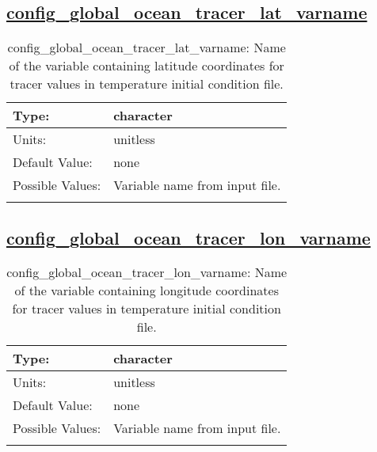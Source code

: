 \subsection[config\_global\_ocean\_tracer\_lat\_varname]{\hyperref[sec:nm_tab_global_ocean]{config\_global\_ocean\_tracer\_lat\_varname}}
\label{subsec:nm_sec_config_global_ocean_tracer_lat_varname}
\begin{center}
\begin{longtable}{| p{2.0in} || p{4.0in} |}
    \hline
    Type: & character \\
    \hline
    Units: & \si{unitless} \\
    \hline
    Default Value: & none \\
    \hline
    Possible Values: & Variable name from input file. \\
    \hline
    \caption{config\_global\_ocean\_tracer\_lat\_varname: Name of the variable containing latitude coordinates for tracer values in temperature initial condition file.}
\end{longtable}
\end{center}
\subsection[config\_global\_ocean\_tracer\_lon\_varname]{\hyperref[sec:nm_tab_global_ocean]{config\_global\_ocean\_tracer\_lon\_varname}}
\label{subsec:nm_sec_config_global_ocean_tracer_lon_varname}
\begin{center}
\begin{longtable}{| p{2.0in} || p{4.0in} |}
    \hline
    Type: & character \\
    \hline
    Units: & \si{unitless} \\
    \hline
    Default Value: & none \\
    \hline
    Possible Values: & Variable name from input file. \\
    \hline
    \caption{config\_global\_ocean\_tracer\_lon\_varname: Name of the variable containing longitude coordinates for tracer values in temperature initial condition file.}
\end{longtable}
\end{center}
